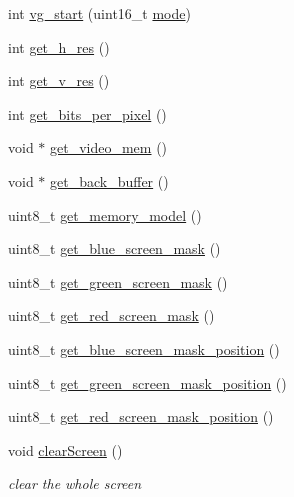 \begin{DoxyCompactItemize}
\item 
int \mbox{\hyperlink{group__video_gac67621adf87bcebb04fab536c7245315}{vg\+\_\+start}} (uint16\+\_\+t \mbox{\hyperlink{group__timer_ggada782f3116a896caaa602b70c0c6d8b7af1982b2b77f9b0e7cd29e39b39d8a0b4}{mode}})
\item 
int \mbox{\hyperlink{group__video_ga3456b8539e4326dd13cbfc4f81b609f1}{get\+\_\+h\+\_\+res}} ()
\item 
int \mbox{\hyperlink{group__video_gaa6c3dbf699d3dda9444bdcd71bf85234}{get\+\_\+v\+\_\+res}} ()
\item 
int \mbox{\hyperlink{group__video_ga93c2bd40f276f3ac190868b704a0b460}{get\+\_\+bits\+\_\+per\+\_\+pixel}} ()
\item 
void $\ast$ \mbox{\hyperlink{group__video_ga1d04069f4e8b1556a7a1ed2cd95bfdea}{get\+\_\+video\+\_\+mem}} ()
\item 
void $\ast$ \mbox{\hyperlink{group__video_gabf77be88afd0e4b1165719c50c8896ba}{get\+\_\+back\+\_\+buffer}} ()
\item 
uint8\+\_\+t \mbox{\hyperlink{group__video_gaee3838c12a8543f378920ab8f6c3cae2}{get\+\_\+memory\+\_\+model}} ()
\item 
uint8\+\_\+t \mbox{\hyperlink{group__video_ga6929228fd26ebbf17efe05d9a72658a7}{get\+\_\+blue\+\_\+screen\+\_\+mask}} ()
\item 
uint8\+\_\+t \mbox{\hyperlink{group__video_ga0f0db7b6e31ed06140761c77d5b338ab}{get\+\_\+green\+\_\+screen\+\_\+mask}} ()
\item 
uint8\+\_\+t \mbox{\hyperlink{group__video_gac758200041aed05cff7f056c48456157}{get\+\_\+red\+\_\+screen\+\_\+mask}} ()
\item 
uint8\+\_\+t \mbox{\hyperlink{group__video_gae739d88cacef84ab9c419526fd0cc635}{get\+\_\+blue\+\_\+screen\+\_\+mask\+\_\+position}} ()
\item 
uint8\+\_\+t \mbox{\hyperlink{group__video_ga6212cfb721ba6c38f52de83d57788d69}{get\+\_\+green\+\_\+screen\+\_\+mask\+\_\+position}} ()
\item 
uint8\+\_\+t \mbox{\hyperlink{group__video_ga5ad95fa9656e4db3ac20e178769336f9}{get\+\_\+red\+\_\+screen\+\_\+mask\+\_\+position}} ()
\item 
void \mbox{\hyperlink{group__video_ga9d7e8af417b6d543da691e9c0e2f6f9f}{clear\+Screen}} ()
\begin{DoxyCompactList}\small\item\em clear the whole screen \end{DoxyCompactList}\item 

\end{DoxyCompactItemize}
